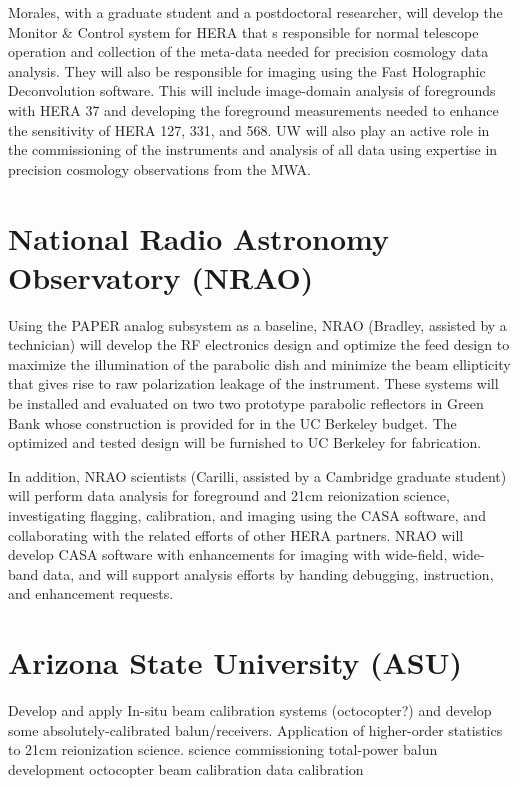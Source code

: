 \documentclass[preprint]{aastex}
\begin{document}
Morales, with a graduate student and a postdoctoral researcher,
will develop the Monitor \& Control system
for HERA that s responsible for normal telescope operation and collection of the
meta-data needed for precision cosmology data analysis. They will also be
responsible for imaging using the Fast Holographic Deconvolution software. This
will include image-domain analysis of foregrounds with HERA 37 and developing the foreground
measurements needed to enhance the sensitivity of HERA 127, 331, and 568. UW
will also play an active role in the commissioning of the instruments and
analysis of all data using expertise in precision cosmology observations from the MWA.

\section*{National Radio Astronomy Observatory (NRAO)}

Using the PAPER analog subsystem as a baseline, NRAO (Bradley, assisted by a
technician) will develop the RF electronics design and optimize the feed design
to maximize the illumination of the parabolic dish and minimize the beam
ellipticity that gives rise to raw polarization leakage of the instrument.
These systems will be installed and evaluated on two two prototype parabolic
reflectors in Green Bank whose construction is provided for in the UC Berkeley
budget.  The optimized and tested design will be furnished to UC Berkeley for
fabrication.

In addition, NRAO scientists (Carilli, assisted by a Cambridge graduate
student) will perform data analysis for foreground and 21cm reionization
science, investigating flagging, calibration, and imaging using the CASA
software, and collaborating with the related efforts of other HERA partners.
NRAO will develop CASA software with enhancements for imaging with wide-field,
wide-band data, and will support analysis efforts by handing debugging,
instruction, and enhancement requests.

\section*{Arizona State University (ASU)}

Develop and apply In-situ beam calibration systems (octocopter?) and develop
some absolutely-calibrated balun/receivers.   Application of higher-order
statistics to 21cm reionization science.  science commissioning total-power
balun development octocopter beam calibration data calibration
\end{document}

